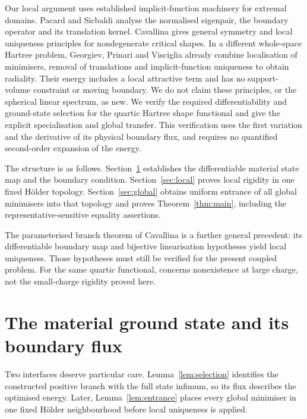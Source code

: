 \documentclass[11pt,a4paper]{article}
\theoremstyle{definition}
\theoremstyle{remark}
\begin{document}
Our local argument uses established implicit-function machinery for extremal domains. Pacard and Sicbaldi \cite{PacardSicbaldi2009} analyse the normalised eigenpair, the boundary operator and its translation kernel. Cavallina \cite{Cavallina2024} gives general symmetry and local uniqueness principles for nondegenerate critical shapes. In a different whole-space Hartree problem, Georgiev, Prinari and Visciglia \cite{GPV2012} already combine localisation of minimisers, removal of translations and implicit-function uniqueness to obtain radiality. Their energy includes a local attractive term and has no support-volume constraint or moving boundary. We do not claim these principles, or the spherical linear spectrum, as new. We verify the required differentiability and ground-state selection for the quartic Hartree shape functional and give the explicit specialisation and global transfer. This verification uses the first variation and the derivative of its physical boundary flux, and requires no quantified second-order expansion of the energy.

The structure is as follows. Section~\ref{sec:state} establishes the differentiable material state map and the boundary condition. Section~\ref{sec:local} proves local rigidity in one fixed H\"older topology. Section~\ref{sec:global} obtains uniform entrance of all global minimisers into that topology and proves Theorem~\ref{thm:main}, including the representative-sensitive equality assertions.


The parameterised branch theorem of Cavallina \cite[Theorem~I]{Cavallina2024families} is a further general precedent: its differentiable boundary map and bijective linearisation hypotheses yield local uniqueness. Those hypotheses must still be verified for the present coupled problem. For the same quartic functional, \cite[Theorem~1.1]{MMR2026screened} concerns nonexistence at large charge, not the small-charge rigidity proved here.

\section{The material ground state and its boundary flux}
\label{sec:state}

Two interfaces deserve particular care. Lemma~\ref{lem:selection} identifies the constructed positive branch with the full state infimum, so its flux describes the optimised energy. Later, Lemma~\ref{lem:entrance} places every global minimiser in one fixed H\"older neighbourhood before local uniqueness is applied.
\end{document}
